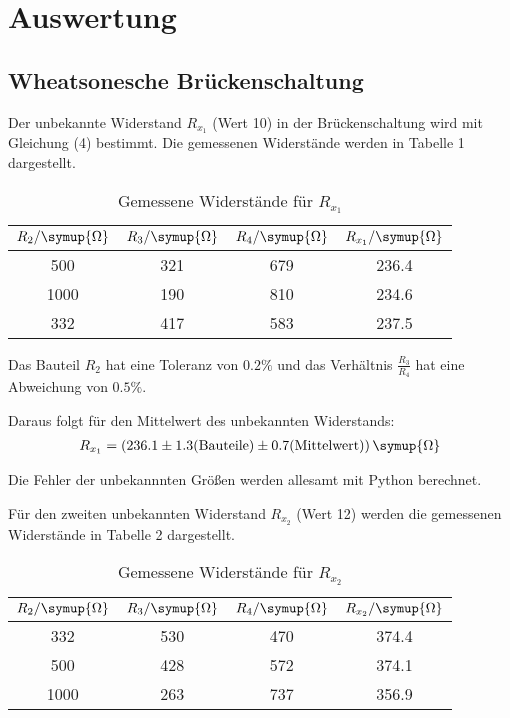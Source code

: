 \section{Auswertung}
\label{sec:Auswertung}

\subsection{Wheatsonesche Brückenschaltung}
Der unbekannte Widerstand $R_{x_1}$ (Wert 10) in der Brückenschaltung wird mit Gleichung (4) bestimmt. Die gemessenen Widerstände
werden in Tabelle 1 dargestellt.

\begin{table}[H]
  \centering
  \caption{Gemessene Widerstände für $R_{x_1}$}
  \label{tab:Widerstand}
  \begin{tabular}{c c c c}
    \toprule
    $R_2/ \symup{\Omega}$ & $R_3/ \symup{\Omega}$ & $R_4 / \symup{\Omega}$ & $R_{x_1}/ \symup{\Omega}$\\
    \midrule
     500  &  321 & 679  &  236.4 \\
    1000  &  190 & 810  &  234.6  \\
     332  &  417 & 583  &  237.5  \\
    \bottomrule
  \end{tabular}
\end{table}



Das Bauteil $R_2$ hat eine Toleranz von $0.2\%$ und das Verhältnis $\frac{R_3}{R_4}$ hat eine Abweichung von
$0.5\%$.

Daraus folgt für den Mittelwert  des unbekannten Widerstands:
\begin{align*}
  R_{x_1} = (236.1 \pm 1.3\text{(Bauteile)} \pm 0.7\text{(Mittelwert)}) \, \symup{\Omega}
\end{align*}

Die Fehler der unbekannnten Größen werden allesamt mit Python berechnet.

Für den zweiten unbekannten Widerstand $R_{x_2}$ (Wert 12) werden die gemessenen Widerstände in Tabelle 2 dargestellt.

\begin{table}[H]
  \centering
  \caption{Gemessene Widerstände für $R_{x_2}$}
  \label{tab:Widerstand}
  \begin{tabular}{c c c c}
    \toprule
    $R_2/ \symup{\Omega}$ & $R_3/ \symup{\Omega}$ & $R_4 / \symup{\Omega}$ & $R_{x_2}/ \symup{\Omega}$ \\
    \midrule
      332  &  530 & 470 & 374.4 \\
      500  &  428 & 572 & 374.1  \\
     1000  &  263 & 737 & 356.9  \\
    \bottomrule
  \end{tabular}
\end{table}

